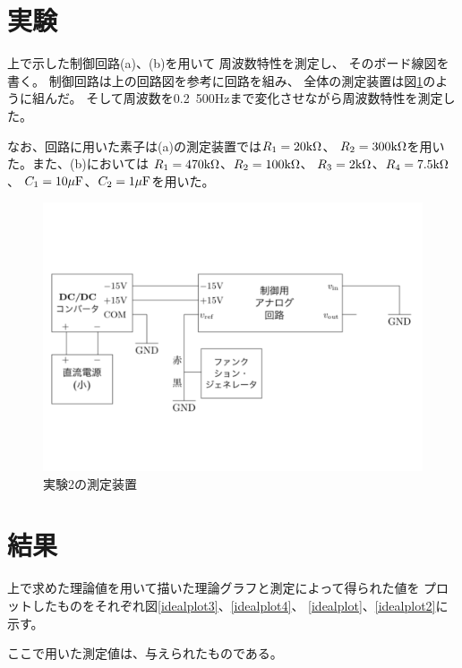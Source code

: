 \documentclass[uplatex, 11pt,a4j, titlepage]{jsarticle}
\begin{document}
\newpage

\section{実験}

上で示した制御回路(a)、(b)を用いて
周波数特性を測定し、
そのボード線図を書く。
制御回路は上の回路図を参考に回路を組み、
全体の測定装置は図\ref{souchi2}のように組んだ。
そして周波数を0.2~500Hzまで変化させながら周波数特性を測定した。

なお、回路に用いた素子は(a)の測定装置では$R_1=20{\rm k \Omega}$、
$R_2=300{\rm k \Omega}$を用いた。また、(b)においては
$R_1=470{\rm k \Omega}$、$R_2=100{\rm k \Omega}$、
$R_3=2{\rm k \Omega}$、$R_4=7.5{\rm k \Omega}$、
$C_1=10{\rm \mu F}$、$C_2=1{\rm \mu F}$を用いた。

\begin{figure}[h]
    \centering
    \includegraphics[width=12cm]{souchi2.pdf}
    \caption{実験2の測定装置}
    \label{souchi2}
\end{figure}

\newpage

\section{結果}

上で求めた理論値を用いて描いた理論グラフと測定によって得られた値を
プロットしたものをそれぞれ図\ref{idealplot3}、\ref{idealplot4}、
\ref{idealplot}、\ref{idealplot2}に示す。

ここで用いた測定値は、与えられたものである。
\end{document}
